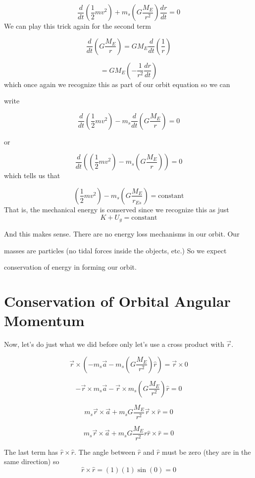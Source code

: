 $$\frac{d}{dt}\left( \frac{1}{2}mv^{2}\right) +m_{s}\left( G\frac{M_{E}}{r^{2}}\right) \frac{dr}{dt}=0$$%
We can play this trick again for the second term%

$$
\frac{d}{dt}\left( G\frac{M_{E}}{r}\right) =GM_{E}\frac{d}{dt}\left( \frac{1}{r}\right) 
$$
	
$$
=GM_{E}\left( -\frac{1}{r^{2}}\frac{dr}{dt}\right) 
$$
which once again we recognize this as part of our orbit equation so we can

write 

$$\frac{d}{dt}\left( \frac{1}{2}mv^{2}\right) -m_{s}\frac{d}{dt}\left( G\frac{M_{E}}{r}\right) =0$$

or 

$$\frac{d}{dt}\left( \left( \frac{1}{2}mv^{2}\right) -m_{s}\left( G\frac{M_{E}}{r}\right) \right) =0 
$$%
which tells us that 

$$
\left( \frac{1}{2}mv^{2}\right) -m_{s}\left( G\frac{M_{E}}{r_{Es}}\right) =\text{constant} 
$$
That is, the mechanical energy is conserved since we recognize this as just 
$$K+U_{g}=\text{constant} $$

And this makes sense. There are no energy loss mechanisms in our orbit. Our

masses are particles (no tidal forces inside the objects, etc.) So we expect

conservation of energy in forming our orbit.


\section{Conservation of Orbital Angular Momentum}


Now, let's do just what we did before only let's use a cross product with 
$\overrightarrow{r}$. 

$$\overrightarrow{r}\times \left( -m_{s}\overrightarrow{a}-m_{s}\left( G\frac{M_{E}}{r^{2}}\right) \hat{r}\right) =\overrightarrow{r}\times 0
$$

$$-\overrightarrow{r}\times m_{s}\overrightarrow{a}-\overrightarrow{r}\times m_{s}\left( G\frac{M_{E}}{r^{2}}\right) \hat{r}=0
$$

$$m_{s}\overrightarrow{r}\times \overrightarrow{a}+m_{s}G\frac{M_{E}}{r^{2}}\overrightarrow{r}\times \hat{r}=0
$$

$$m_{s}\overrightarrow{r}\times \overrightarrow{a}+m_{s}G\frac{M_{E}}{r^{2}}r\hat{r}\times \hat{r}=0
$$

The last term has $\hat{r}\times \hat{r}.$ The angle between $\hat{r}$ and $\hat{r}$ must be zero (they are in the same direction) so 
$$\hat{r}\times \hat{r}=\left( 1\right) \left( 1\right) \sin \left( 0\right) =0$$

